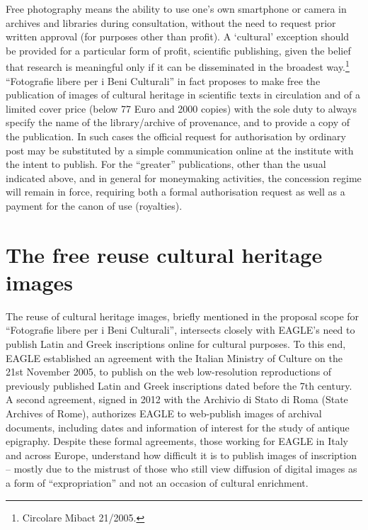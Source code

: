 \documentclass[amsthm,ebook]{saparticle}
\begin{document}
Free photography means the ability to use one’s own smartphone or camera in archives and libraries during consultation,
without the need to request prior written approval (for purposes other than profit). A `cultural’ exception should be
provided for a particular form of profit, scientific publishing, given the belief that research is meaningful only if
it can be disseminated in the broadest way.\footnote{Circolare Mibact 21/2005.} ``Fotografie libere per i Beni
Culturali'' in fact proposes to make free the publication of images of cultural heritage in scientific texts in
circulation and of a limited cover price (below 77 Euro and 2000 copies) with the sole duty to always specify the name
of the library/archive of provenance, and to provide a copy of the publication. In such cases the official request for
authorisation by ordinary post may be substituted by a simple communication online at the institute with the intent to
publish. For the ``greater'' publications, other than the usual indicated above, and in general for moneymaking
activities, the concession regime will remain in force, requiring both a formal authorisation request as well as a
payment for the canon of use (royalties).






\section{The free reuse cultural heritage images}




The reuse of cultural heritage images, briefly mentioned in the proposal scope for ``Fotografie libere per i Beni
Culturali'', intersects closely with EAGLE’s need to publish Latin and Greek inscriptions online for cultural purposes.
To this end, EAGLE established an agreement with the Italian Ministry of Culture on the 21st November 2005, to publish
on the web low-resolution reproductions of previously published Latin and Greek inscriptions dated before the 7th
century. A second agreement, signed in 2012 with the Archivio di Stato di Roma (State Archives of Rome), authorizes
EAGLE to web-publish images of archival documents, including dates and information of interest for the study of antique
epigraphy. Despite these formal agreements, those working for EAGLE in Italy and across Europe, understand how
difficult it is to publish images of inscription – mostly due to the mistrust of those who still view diffusion of
digital images as a form of ``expropriation'' and not an occasion of cultural enrichment.
\end{document}
